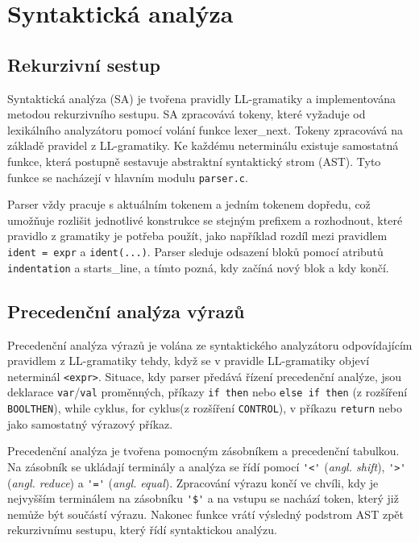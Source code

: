 \section{Syntaktická analýza}\label{sec:parser}

\subsection{Rekurzivní sestup}\label{sec:rek-sestup}
Syntaktická analýza (SA) je tvořena pravidly LL-gramatiky a implementována metodou rekurzivního sestupu. SA zpracovává tokeny, které vyžaduje od lexikálního analyzátoru pomocí volání funkce lexer\_next. Tokeny zpracovává na základě pravidel z LL-gramatiky. Ke každému neterminálu existuje samostatná funkce, která postupně sestavuje abstraktní syntaktický strom (AST). Tyto funkce se nacházejí v hlavním modulu \verb|parser.c|.

Parser vždy pracuje s aktuálním tokenem a jedním tokenem dopředu, což umožňuje rozlišit jednotlivé konstrukce se stejným prefixem a rozhodnout, které pravidlo z gramatiky je potřeba použít, jako například rozdíl mezi pravidlem \verb|ident = expr| a \verb|ident(...)|. Parser sleduje odsazení bloků pomocí atributů \verb|indentation| a starts\_line, a tímto pozná, kdy začíná nový blok a kdy končí.




\subsection{Precedenční analýza výrazů}\label{sec:precedence}

Precedenční analýza výrazů je volána ze syntaktického analyzátoru odpovídajícím pravidlem z LL-gramatiky tehdy, když se v pravidle LL-gramatiky objeví neterminál \verb|<expr>|. Situace, kdy parser předává řízení precedenční analýze, jsou deklarace \verb|var|/\verb|val| proměnných, příkazy \verb|if then| nebo \verb|else if then| (z rozšíření \verb|BOOLTHEN|),  while cyklus, for cyklus(z rozšíření \verb|CONTROL|), v příkazu \verb|return| nebo jako samostatný výrazový příkaz.

Precedenční analýza je tvořena pomocným zásobníkem a precedenční tabulkou. Na zásobník se ukládají terminály a analýza se řídí pomocí \verb|'<'| (\textit{angl. shift}), \verb|'>'| (\textit{angl. reduce}) a \verb|'='| (\textit{angl. equal}). Zpracování výrazu končí ve chvíli, kdy je nejvyšším terminálem na zásobníku \verb|'$'| a na vstupu se nachází token, který již nemůže být součástí výrazu. Nakonec funkce vrátí výsledný podstrom AST zpět rekurzivnímu sestupu, který řídí syntaktickou analýzu.



